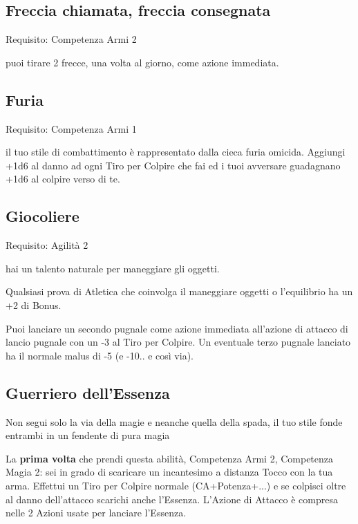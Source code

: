 \documentclass[a4paper,11pt,twoside,openany]{book}
\begin{document}
\subsection{Freccia chiamata, freccia consegnata}

Requisito: Competenza Armi 2

puoi tirare 2 frecce, una volta al giorno, come azione immediata.

\subsection{Furia}

Requisito: Competenza Armi 1

il tuo stile di combattimento è rappresentato dalla cieca furia omicida. Aggiungi +1d6 al danno ad ogni Tiro per Colpire che fai ed i tuoi avversare guadagnano +1d6 al colpire verso di te.

\subsection{Giocoliere}

Requisito: Agilità 2

hai un talento naturale per maneggiare gli oggetti.

Qualsiasi prova di Atletica che coinvolga il maneggiare oggetti o l'equilibrio ha un +2 di Bonus.

Puoi lanciare un secondo pugnale come azione immediata all'azione di attacco di lancio pugnale con un -3 al Tiro per Colpire. Un eventuale terzo pugnale lanciato ha il normale malus di -5 (e -10.. e così via).

\subsection{Guerriero dell'Essenza}

Non segui solo la via della magie e neanche quella della spada, il tuo stile fonde entrambi in un fendente di pura magia

La \textbf{prima volta} che prendi questa abilità, Competenza Armi 2, Competenza Magia 2: sei in grado di scaricare un incantesimo a distanza Tocco con la tua arma. Effettui un Tiro per Colpire normale (CA+Potenza+...) e se colpisci oltre al danno dell'attacco scarichi anche l'Essenza. L'Azione di Attacco è compresa nelle 2 Azioni usate per lanciare l'Essenza.
\end{document}
